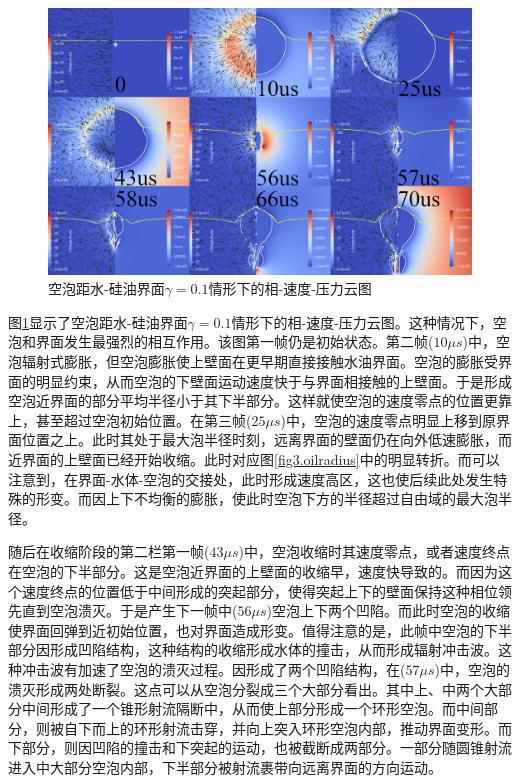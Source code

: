 \begin{figure}[h]
    \centering
    \includegraphics[width=0.9\linewidth]{img/fig3.oil.0.1.png}
    \caption{空泡距水-硅油界面$\gamma = 0.1$情形下的相-速度-压力云图}
    \label{fig3.oil0.1}
\end{figure}

图\ref{fig3.oil0.1}显示了空泡距水-硅油界面$\gamma = 0.1$情形下的相-速度-压力云图。这种情况下，空泡和界面发生最强烈的相互作用。该图第一帧仍是初始状态。第二帧($10\mu s$)中，空泡辐射式膨胀，但空泡膨胀使上壁面在更早期直接接触水油界面。空泡的膨胀受界面的明显约束，从而空泡的下壁面运动速度快于与界面相接触的上壁面。于是形成空泡近界面的部分平均半径小于其下半部分。这样就使空泡的速度零点的位置更靠上，甚至超过空泡初始位置。在第三帧($25\mu s$)中，空泡的速度零点明显上移到原界面位置之上。此时其处于最大泡半径时刻，远离界面的壁面仍在向外低速膨胀，而近界面的上壁面已经开始收缩。此时对应图\ref{fig3.oilradius}中的明显转折。而可以注意到，在界面-水体-空泡的交接处，此时形成速度高区，这也使后续此处发生特殊的形变。而因上下不均衡的膨胀，使此时空泡下方的半径超过自由域的最大泡半径。

随后在收缩阶段的第二栏第一帧($43\mu s$)中，空泡收缩时其速度零点，或者速度终点在空泡的下半部分。这是空泡近界面的上壁面的收缩早，速度快导致的。而因为这个速度终点的位置低于中间形成的突起部分，使得突起上下的壁面保持这种相位领先直到空泡溃灭。于是产生下一帧中($56\mu s$)空泡上下两个凹陷。而此时空泡的收缩使界面回弹到近初始位置，也对界面造成形变。值得注意的是，此帧中空泡的下半部分因形成凹陷结构，这种结构的收缩形成水体的撞击，从而形成辐射冲击波。这种冲击波有加速了空泡的溃灭过程。因形成了两个凹陷结构，在($57\mu s$)中，空泡的溃灭形成两处断裂。这点可以从空泡分裂成三个大部分看出。其中上、中两个大部分中间形成了一个锥形射流隔断中，从而使上部分形成一个环形空泡。而中间部分，则被自下而上的环形射流击穿，并向上突入环形空泡内部，推动界面变形。而下部分，则因凹陷的撞击和下突起的运动，也被截断成两部分。一部分随圆锥射流进入中大部分空泡内部，下半部分被射流裹带向远离界面的方向运动。


